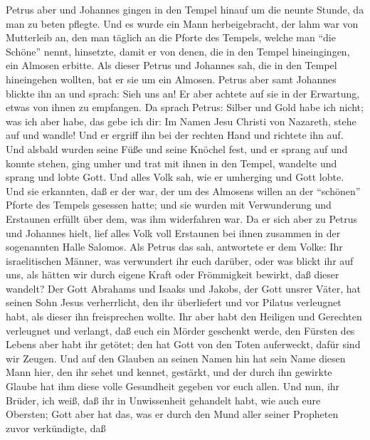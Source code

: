  Petrus aber und Johannes gingen in den Tempel hinauf um
die neunte Stunde, da man zu beten pflegte.  Und es wurde
ein Mann herbeigebracht, der lahm war von Mutterleib an, den man täglich
an die Pforte des Tempels, welche man ``die Schöne'' nennt, hinsetzte,
damit er von denen, die in den Tempel hineingingen, ein Almosen erbitte.
 Als dieser Petrus und Johannes sah, die in den Tempel
hineingehen wollten, bat er sie um ein Almosen.  Petrus
aber samt Johannes blickte ihn an und sprach: Sieh uns an!
 Er aber achtete auf sie in der Erwartung, etwas von ihnen
zu empfangen.  Da sprach Petrus: Silber und Gold habe ich
nicht; was ich aber habe, das gebe ich dir: Im Namen Jesu Christi von
Nazareth, stehe auf und wandle!  Und er ergriff ihn bei
der rechten Hand und richtete ihn auf. Und alsbald wurden seine Füße und
seine Knöchel fest,  und er sprang auf und konnte stehen,
ging umher und trat mit ihnen in den Tempel, wandelte und sprang und
lobte Gott.  Und alles Volk sah, wie er umherging und Gott
lobte.  Und sie erkannten, daß er der war, der um des
Almosens willen an der ``schönen'' Pforte des Tempels gesessen hatte;
und sie wurden mit Verwunderung und Erstaunen erfüllt über dem, was ihm
widerfahren war.  Da er sich aber zu Petrus und Johannes
hielt, lief alles Volk voll Erstaunen bei ihnen zusammen in der
sogenannten Halle Salomos.  Als Petrus das sah,
antwortete er dem Volke: Ihr israelitischen Männer, was verwundert ihr
euch darüber, oder was blickt ihr auf uns, als hätten wir durch eigene
Kraft oder Frömmigkeit bewirkt, daß dieser wandelt?  Der
Gott Abrahams und Isaaks und Jakobs, der Gott unsrer Väter, hat seinen
Sohn Jesus verherrlicht, den ihr überliefert und vor Pilatus verleugnet
habt, als dieser ihn freisprechen wollte.  Ihr aber habt
den Heiligen und Gerechten verleugnet und verlangt, daß euch ein Mörder
geschenkt werde,  den Fürsten des Lebens aber habt ihr
getötet; den hat Gott von den Toten auferweckt, dafür sind wir Zeugen.
 Und auf den Glauben an seinen Namen hin hat sein Name
diesen Mann hier, den ihr sehet und kennet, gestärkt, und der durch ihn
gewirkte Glaube hat ihm diese volle Gesundheit gegeben vor euch allen.
 Und nun, ihr Brüder, ich weiß, daß ihr in Unwissenheit
gehandelt habt, wie auch eure Obersten;  Gott aber hat
das, was er durch den Mund aller seiner Propheten zuvor verkündigte, daß
